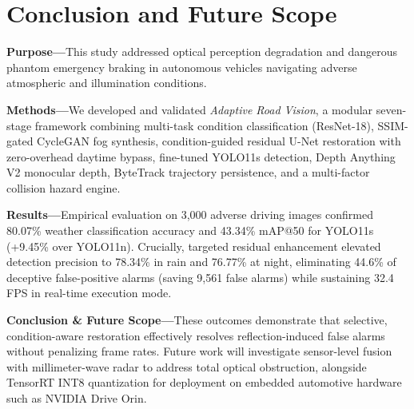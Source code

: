 \documentclass[conference]{IEEEtran}
\begin{document}
\section{Conclusion and Future Scope}
\label{sec:conclusion}

\textbf{Purpose---}This study addressed optical perception degradation and dangerous phantom emergency braking in autonomous vehicles navigating adverse atmospheric and illumination conditions.

\textbf{Methods---}We developed and validated \textit{Adaptive Road Vision}, a modular seven-stage framework combining multi-task condition classification (ResNet-18), SSIM-gated CycleGAN fog synthesis, condition-guided residual U-Net restoration with zero-overhead daytime bypass, fine-tuned YOLO11s detection, Depth Anything V2 monocular depth, ByteTrack trajectory persistence, and a multi-factor collision hazard engine.

\textbf{Results---}Empirical evaluation on 3,000 adverse driving images confirmed 80.07\% weather classification accuracy and 43.34\% mAP@50 for YOLO11s (+9.45\% over YOLO11n). Crucially, targeted residual enhancement elevated detection precision to 78.34\% in rain and 76.77\% at night, eliminating 44.6\% of deceptive false-positive alarms (saving 9,561 false alarms) while sustaining 32.4 FPS in real-time execution mode.

\textbf{Conclusion \& Future Scope---}These outcomes demonstrate that selective, condition-aware restoration effectively resolves reflection-induced false alarms without penalizing frame rates. Future work will investigate sensor-level fusion with millimeter-wave radar to address total optical obstruction, alongside TensorRT INT8 quantization for deployment on embedded automotive hardware such as NVIDIA Drive Orin.
\end{document}
